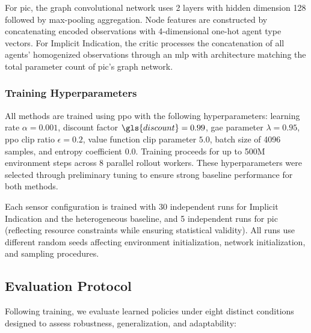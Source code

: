 For \gls{pic}, the graph convolutional network uses 2 layers with hidden dimension 128\, 
followed by max-pooling aggregation. Node features are constructed by concatenating
encoded observations with 4-dimensional one-hot agent type vectors. 
For Implicit Indication, the critic processes the concatenation of all agents' 
homogenized observations through an \gls{mlp} with architecture matching the total 
parameter count of \gls{pic}'s graph network.

\subsubsection{Training Hyperparameters}

All methods are trained using \gls{ppo} with the following hyperparameters: 
learning rate \(\alpha = 0.001\), discount factor \(\gls{discount} = 0.99\), 
\gls{gae} parameter \(\lambda = 0.95\), \gls{ppo} clip ratio \(\epsilon = 0.2\), 
value function clip parameter \(5.0\), batch size of 4096 samples, 
and entropy coefficient \(0.0\). 
Training proceeds for up to 500M environment steps across 8 parallel rollout workers. 
These hyperparameters were selected through preliminary tuning to ensure strong 
baseline performance for both methods.

Each sensor configuration is trained with 30 independent runs for Implicit Indication 
and the heterogeneous baseline, and 5 independent runs for \gls{pic}
(reflecting resource constraints while ensuring statistical validity). 
All runs use different random seeds affecting environment initialization, 
network initialization, and sampling procedures.

\subsection{Evaluation Protocol}

Following training, we evaluate learned policies under eight distinct 
conditions designed to assess robustness, generalization, and adaptability:

